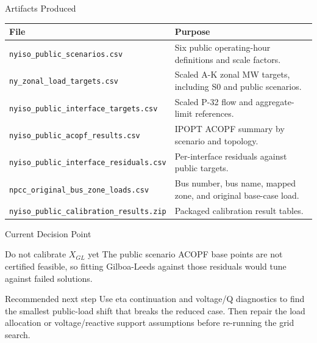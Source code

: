 \documentclass[aspectratio=169,10pt]{beamer}
\begin{document}
\begin{frame}{Artifacts Produced}
\scriptsize
\begin{tabularx}{\linewidth}{l X}
\toprule
\textbf{File} & \textbf{Purpose} \\
\midrule
\texttt{nyiso\_public\_scenarios.csv} & Six public operating-hour definitions and scale factors. \\
\texttt{ny\_zonal\_load\_targets.csv} & Scaled A-K zonal MW targets, including S0 and public scenarios. \\
\texttt{nyiso\_public\_interface\_targets.csv} & Scaled P-32 flow and aggregate-limit references. \\
\texttt{nyiso\_public\_acopf\_results.csv} & IPOPT ACOPF summary by scenario and topology. \\
\texttt{nyiso\_public\_interface\_residuals.csv} & Per-interface residuals against public targets. \\
\texttt{npcc\_original\_bus\_zone\_loads.csv} & Bus number, bus name, mapped zone, and original base-case load. \\
\texttt{nyiso\_public\_calibration\_results.zip} & Packaged calibration result tables. \\
\bottomrule
\end{tabularx}
\end{frame}

\begin{frame}{Current Decision Point}
\begin{block}{Do not calibrate $X_{GL}$ yet}
The public scenario ACOPF base points are not certified feasible, so fitting Gilboa-Leeds against those residuals would tune against failed solutions.
\end{block}

\begin{block}{Recommended next step}
Use eta continuation and voltage/Q diagnostics to find the smallest public-load shift that breaks the reduced case. Then repair the load allocation or voltage/reactive support assumptions before re-running the grid search.
\end{block}
\end{frame}
\end{document}
